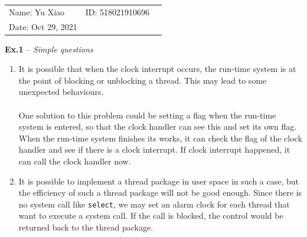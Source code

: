 \documentclass{article}
\begin{document}
\begin{spacing}{2.0}
\vspace*{0.25cm}
\hrulefill
\thispagestyle{empty}
\begin{center}
\begin{large}
\end{large}

\hrulefill


\vspace*{5cm}
\begin{Large}
\end{Large}
\vspace{2em}
\end{center}
\vfill

\begin{table}[h!]
\flushleft
\begin{tabular}{lll}
Name: Yu Xiao \hspace*{2em}&
ID: 518021910696 \hspace*{2em}\\

Date: Oct 29, 2021
\end{tabular}
\end{table}
\end{spacing}

\hfill

\newpage
\noindent\textbf{Ex.1} -- \textit{Simple questions}
\begin{enumerate}
	\item It is possible that when the clock interrupt occurs, the run-time system is at the point of blocking or unblocking a thread. This may lead to some unexpected behaviours.\\ \\
	One solution to this problem could be setting a flag when the run-time system is entered, so that the clock handler can see this and set its own flag. When the run-time system finishes its works, it can check the flag of the clock handler and see if there is a clock interrupt. If clock interrupt happened, it can call the clock handler now.\\
	\item It is possible to implement a thread package in user space in such a case, but the efficiency of such a thread package will not be good enough. Since there is no system call like \texttt{select}, we may set an alarm clock for each thread that want to execute a system call. If the call is blocked, the control would be returned back to the thread package.
\end{enumerate}
\end{document}
